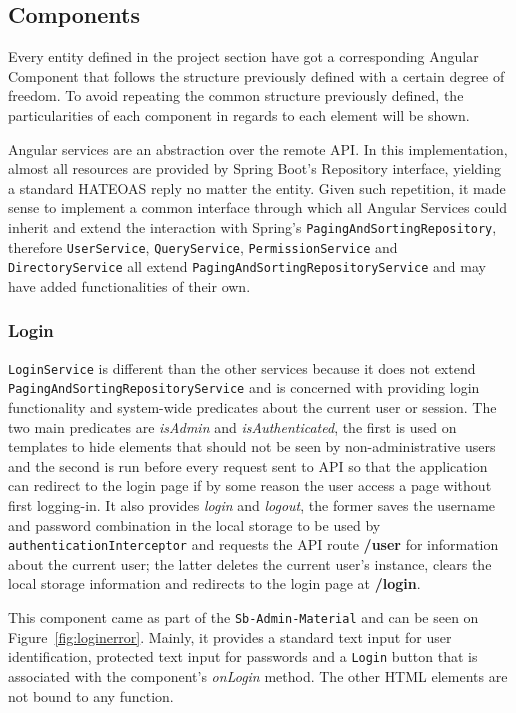 \subsection{Components}
Every entity defined in the project section have got a corresponding Angular Component that follows the structure previously defined with a certain degree of freedom. To avoid repeating the common structure previously defined, the particularities of each component in regards to each element will be shown.

Angular services are an abstraction over the remote \gls{API}. In this implementation, almost all resources are provided by Spring Boot's Repository interface, yielding a standard \gls{HATEOAS} reply no matter the entity. Given such repetition, it made sense to implement a common interface through which all Angular Services could inherit and extend the interaction with Spring's \texttt{PagingAndSortingRepository}, therefore  \texttt{UserService}, \texttt{QueryService}, \texttt{PermissionService} and \texttt{DirectoryService} all extend \texttt{PagingAndSortingRepositoryService} and may have added functionalities of their own.

\subsubsection{Login}
\texttt{LoginService} is different than the other services because it does not extend \texttt{PagingAndSortingRepositoryService} and is concerned with providing login functionality and system-wide predicates about the current user or session. The two main predicates are \textit{isAdmin} and \textit{isAuthenticated}, the first is used on templates to hide elements that should not be seen by non-administrative users and the second is run before every request sent to \gls{API} so that the application can redirect to the login page if by some reason the user access a page without first logging-in. It also provides \textit{login} and \textit{logout}, the former saves the username and password combination in the local storage to be used by \texttt{authenticationInterceptor} and requests the \gls{API} route \textbf{/user} for information about the current user; the latter deletes the current user's instance, clears the local storage information and redirects to the login page at \textbf{/login}.

This component came as part of the \texttt{Sb-Admin-Material} and can be seen on Figure~\ref{fig:loginerror}. Mainly, it provides a standard text input for user identification, protected text input for passwords and a \texttt{Login} button that is associated with the component's \textit{onLogin} method. The other \gls{HTML} elements are not bound to any function.

